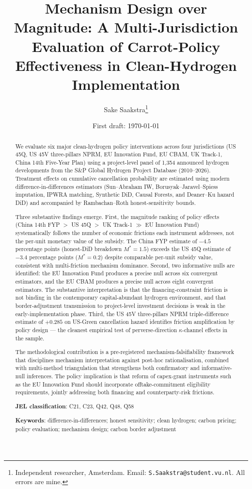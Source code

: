 \documentclass[12pt,a4paper]{article}
\title{Mechanism Design over Magnitude: A Multi-Jurisdiction Evaluation of Carrot-Policy Effectiveness in Clean-Hydrogen Implementation}
\author{Sake Saakstra\thanks{Independent researcher, Amsterdam. Email: \texttt{S.Saakstra@student.vu.nl}. All errors are mine.}}
\date{First draft: \today}
\theoremstyle{plain}
\theoremstyle{definition}
\begin{document}
\maketitle

\begin{abstract}
\noindent
We evaluate six major clean-hydrogen policy interventions across four jurisdictions (US 45Q, US 45V three-pillars NPRM, EU Innovation Fund, EU CBAM, UK Track-1, China 14th Five-Year Plan) using a project-level panel of 1,354 announced hydrogen developments from the S\&P Global Hydrogen Project Database (2010--2026). Treatment effects on cumulative cancellation probability are estimated using modern difference-in-differences estimators (Sun--Abraham IW, Borusyak--Jaravel--Spiess imputation, IPWRA matching, Synthetic DiD, Causal Forests, and Deaner--Ku hazard DiD) and accompanied by Rambachan--Roth honest-sensitivity bounds.

Three substantive findings emerge. First, the magnitude ranking of policy effects (China 14th FYP $>$ US 45Q $>$ UK Track-1 $\gg$ EU Innovation Fund) systematically follows the number of economic frictions each instrument addresses, not the per-unit monetary value of the subsidy. The China FYP estimate of $-4.5$ percentage points (honest-DiD breakdown $M^{*} = 1.5$) exceeds the US 45Q estimate of $-3.4$ percentage points ($M^{*} = 0.2$) despite comparable per-unit subsidy value, consistent with multi-friction mechanism dominance. Second, two informative nulls are identified: the EU Innovation Fund produces a precise null across six convergent estimators, and the EU CBAM produces a precise null across eight convergent estimators. The substantive interpretation is that the financing-constraint friction is not binding in the contemporary capital-abundant hydrogen environment, and that border-adjustment transmission to project-level investment decisions is weak in the early-implementation phase. Third, the US 45V three-pillars NPRM triple-difference estimate of $+0.285$ on US-Green cancellation hazard identifies friction amplification by policy design --- the cleanest empirical test of perverse-direction $\kappa$-channel effects in the sample.

The methodological contribution is a pre-registered mechanism-falsifiability framework that disciplines mechanism interpretation against post-hoc rationalisation, combined with multi-method triangulation that strengthens both confirmatory and informative-null inferences. The policy implication is that reform of capex-grant instruments such as the EU Innovation Fund should incorporate offtake-commitment eligibility requirements, jointly addressing both financing and counterparty-risk frictions.

\medskip
\noindent\textbf{JEL classification}: C21, C23, Q42, Q48, Q58

\noindent\textbf{Keywords}: difference-in-differences; honest sensitivity; clean hydrogen; carbon pricing; policy evaluation; mechanism design; carbon border adjustment
\end{abstract}
\end{document}
